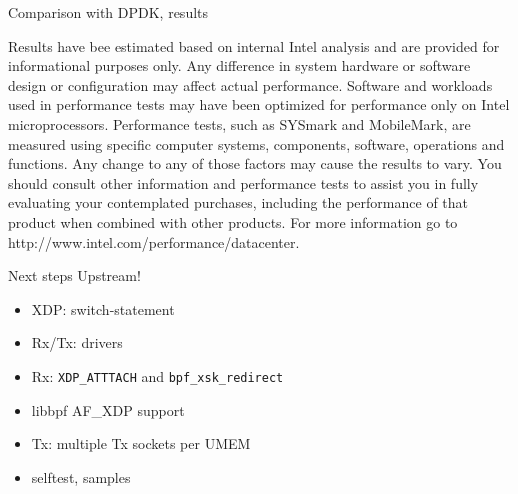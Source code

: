 \documentclass[aspectratio=169, xcolor=table]{beamer}
\begin{document}
  {%
  \begin{frame}{Comparison with DPDK, results}
  \fontsize{3pt}{2pt}\selectfont
    \begin{center}\end{center}
  Results have bee estimated based on internal Intel analysis and are
  provided for informational purposes only. Any difference in system
  hardware or software design or configuration may affect actual
  performance. Software and workloads used in performance tests may
  have been optimized for performance only on Intel
  microprocessors. Performance tests, such as SYSmark and MobileMark,
  are measured using specific computer systems, components, software,
  operations and functions. Any change to any of those factors may
  cause the results to vary. You should consult other information and
  performance tests to assist you in fully evaluating your
  contemplated purchases, including the performance of that product
  when combined with other products. For more information go to
  http://www.intel.com/performance/datacenter.  
  \end{frame}
  }

  \begin{frame}{Next steps}
    Upstream!
    \begin{itemize}
      \item XDP: switch-statement
      \item Rx/Tx: drivers
      \item Rx: {\tt XDP\_ATTTACH} and {\tt bpf\_xsk\_redirect}
      \item libbpf AF\_XDP support
      \item Tx: multiple Tx sockets per UMEM
      \item selftest, samples
    \end{itemize}    
  \end{frame}
\end{document}
